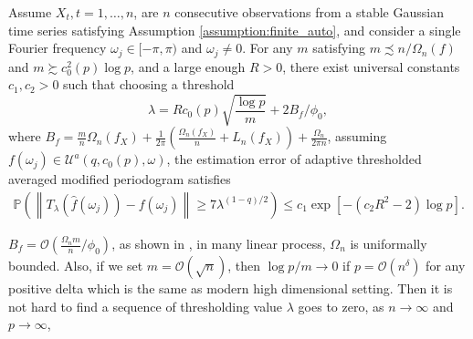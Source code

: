 \begin{prop}
\label{prop: gauss_prop}
Assume ${X}_t, t=1,\ldots,n$, are $n$ consecutive observations from a stable Gaussian time series satisfying Assumption \ref{assumption:finite_auto}, and consider a single Fourier frequency $\omega_j \in [-\pi, \pi)$ and $\omega_j \neq 0$. 
For any $m $ satisfying $m \precsim n/ \Omega_n(f)$ and $m \succsim c_0^2(p)\log p$, and a large enough $R > 0$,  
there exist universal constants $c_1, c_2 > 0$ such that choosing a threshold 
\begin{equation}
\label{eq:threshold_value}
\lambda = R c_0(p)\sqrt{\frac{\log p}{m}} +2B_f/\phi_0, 
\end{equation}
where $B_f = \frac{m}{n}\Omega_n(f_X) + \frac{1}{2\pi}\left(\frac{\Omega_n(f_X)}{n}+L_n(f_X)\right) +\frac{\Omega_n}{2\pi n}$, 
assuming $f(\omega_j)\in \mathcal{U}^a(q, c_0(p), \omega)$, 
the estimation error of adaptive thresholded averaged modified periodogram satisfies 
\begin{equation}
\begin{aligned}
\mathbb{P}\left(\left\|T_{\lambda}(\hat{f}(\omega_j)) - f(\omega_j)\right\|\ge 7 \lambda^{(1-q)/2} \right)
\le c_1 \exp\left[-(c_2 R^2-2)\log p\right]. \nonumber
\end{aligned}
\end{equation}
\end{prop}

\begin{remark}
$B_f = \mathcal{O}(\frac{\Omega_n m}{n}/\phi_0)$, as shown in \cite{sun2018large}, in many linear process, $\Omega_n$ is uniformally bounded. Also, if we set $m=\mathcal{O}(\sqrt{n})$, then $\log p/m \rightarrow 0$ if $p = \mathcal{O}(n^\delta)$ for any positive delta which is the same as modern high dimensional setting. Then it is not hard to find a sequence of thresholding value $\lambda$ goes to zero, as $n\rightarrow \infty$ and $p\rightarrow \infty$, 
\end{remark}











